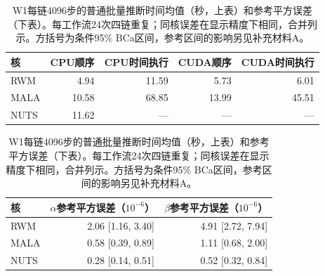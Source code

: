 \begin{table}[htbp]\centering\small
\begin{tabular}{lrrrr}\toprule
核 & CPU顺序 & CPU时间执行 & CUDA顺序 & CUDA时间执行\\\midrule
RWM & 4.94 & 11.59 & 5.73 & 6.01\\
MALA & 10.58 & 68.85 & 13.99 & 45.51\\
NUTS & 11.62 & --- & --- & ---\\\bottomrule
\end{tabular}
\par\medskip
\begin{tabular}{lrr}\toprule
核 & $\alpha$参考平方误差（$10^{-6}$） & $\beta$参考平方误差（$10^{-6}$）\\\midrule
RWM & 2.06 [1.16, 3.40] & 4.91 [2.72, 7.94]\\
MALA & 0.58 [0.39, 0.89] & 1.11 [0.68, 2.00]\\
NUTS & 0.28 [0.14, 0.51] & 0.52 [0.32, 0.84]\\\bottomrule
\end{tabular}
\caption{W1每链4096步的普通批量推断时间均值（秒，上表）和参考平方误差（下表）。每工作流24次四链重复；同核误差在显示精度下相同，合并列示。方括号为条件95\% BCa区间，参考区间的影响另见补充材料A。}\label{tab:wells-v5}
\end{table}
